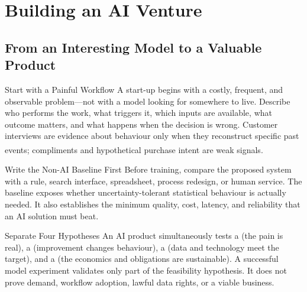 
\chapter{Building an AI Venture}

\label{ch:startup}

\section{From an Interesting Model to a Valuable Product}

\begin{v3topic}{Start with a Painful Workflow}
A start-up begins with a costly, frequent, and observable problem---not with a
model looking for somewhere to live.
Describe who performs the work, what triggers it, which inputs are available,
what outcome matters, and what happens when the decision is wrong.
Customer interviews are evidence about behaviour only when they reconstruct
specific past events; compliments and hypothetical purchase intent are weak
signals\textsuperscript{\cite{constableTalkingHumansSuccess2014}}.

\end{v3topic}
\begin{v3topic}{Write the Non-AI Baseline First}
Before training, compare the proposed system with a rule, search interface,
spreadsheet, process redesign, or human service.
The baseline exposes whether uncertainty-tolerant statistical behaviour is
actually needed.
It also establishes the minimum quality, cost, latency, and reliability that
an AI solution must beat.

\end{v3topic}
\begin{v3topic}{Separate Four Hypotheses}
An AI product simultaneously tests a  (the pain is
real), a  (improvement changes behaviour), a
 (data and technology meet the target), and a
 (the economics and obligations are sustainable).
A successful model experiment validates only part of the feasibility
hypothesis.
It does not prove demand, workflow adoption, lawful data rights, or a viable
business.
\end{v3topic}

